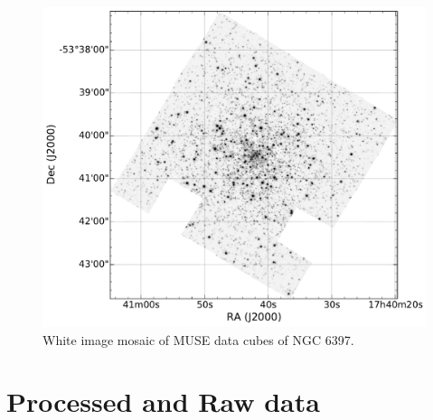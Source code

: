 \begin{figure}[h]
        \centering
        \includegraphics[scale=.6]{assets/images/mosaic.pdf}
        \caption{White image mosaic of MUSE data cubes of NGC 6397. }
\label{fig:clustermuse}
\end{figure}

\section{Processed and Raw data} 

